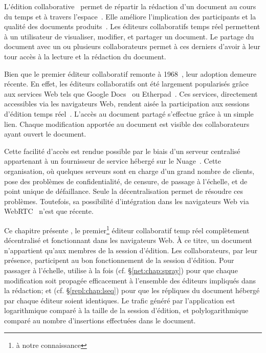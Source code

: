 
\lettrine{L}'édition collaborative~\cite{ellis1989concurrency,
  johansen1988groupware} permet de répartir la rédaction d'un document au cours
du temps et à travers l'espace~\cite{desanctis1987foundation,
  grudin1994computersupported, johansen1988groupware}. Elle améliore
l'implication des participants et la qualité des documents
produits~\cite{giles2005internet, noel2004empirical}. Les éditeurs collaboratifs
temps réel permettent à un utilisateur de visualiser, modifier, et partager un
document. Le partage du document avec un ou plusieurs collaborateurs permet à
ces derniers d'avoir à leur tour accès à la lecture et la rédaction du document.

Bien que le premier éditeur collaboratif remonte à
1968~\cite{engelbart1968research}, leur adoption demeure récente. En effet, les
éditeurs collaboratifs ont été largement popularisés grâce aux services Web tels
que Google Docs~\cite{googledocs} ou Etherpad~\cite{etherpad}. Ces
services, directement accessibles via les navigateurs Web, rendent aisée la
participation aux sessions d'édition temps réel~\cite{mogan2010impact}. L'accès
au document partagé s'effectue grâce à un simple lien. Chaque modification
apportée au document est visible des collaborateurs ayant ouvert le document.

Cette facilité d'accès est rendue possible par le biais d'un serveur centralisé
appartenant à un fournisseur de service hébergé sur le
Nuage~\cite{mell2011national}. Cette organisation, où quelques serveurs sont en
charge d'un grand nombre de clients, pose des problèmes de confidentialité,
de censure, de passage à l'échelle, et de point unique de défaillance. Seule la
décentralisation permet de résoudre ces problèmes. Toutefois, sa possibilité
d'intégration dans les navigateurs Web via WebRTC~\cite{webrtc} n'est que
récente.


Ce chapitre présente \CRATE, le premier\footnote{à notre connaissance} éditeur
collaboratif temp réel complètement décentralisé et fonctionnant dans les
navigateurs Web. À ce titre, un document n'appartient qu'aux membres de la
session d'édition. Les collaborateurs, par leur présence, participent au bon
fonctionnement de la session d'édition. Pour passager à l'échelle, \CRATE
utilise à la fois \SPRAY (cf. §\ref{net:chap:spray}) pour que chaque
modification soit propagée efficacement à l'ensemble des éditeurs impliqués dans
la rédaction; et \LSEQ (cf. §\ref{repl:chap:lseq}) pour que les répliques du
document hébergé par chaque éditeur soient identiques. Le trafic généré par
l'application est logarithmique comparé à la taille de la session d'édition, et
polylogarithmique comparé au nombre d'insertions effectuées dans le document.

